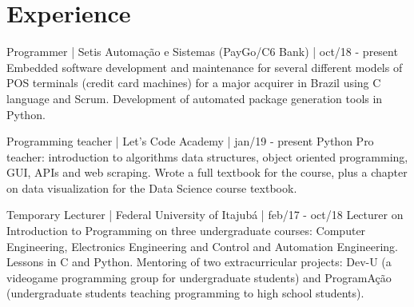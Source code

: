 \documentclass[]{cv-style}          %
\begin{document}
\section{Experience}
\vspace{-0.3cm}
\begin{entrylist}


\entry
{}
{Programmer | Setis Automação e Sistemas (PayGo/C6 Bank) | oct/18 - present}
{\vspace{-0.01cm}}
{Embedded software development and maintenance for several different models of POS terminals (credit card machines) for a major acquirer in Brazil using C language and Scrum. Development of automated package generation tools in Python.}
{}

\entry
  {}
  {Programming teacher | Let's Code Academy | jan/19 - present}
  {\vspace{-0.01cm}}
{Python Pro teacher: introduction to algorithms data structures, object oriented programming, GUI, APIs and web scraping. Wrote a full textbook for the course, plus a chapter on data visualization for the Data Science course textbook.}
 {} %

\entry
  {}
  {Temporary Lecturer | Federal University of Itajubá | feb/17 - oct/18}
{\vspace{-0.01cm}}
{ Lecturer on Introduction to Programming on three undergraduate courses: Computer Engineering, Electronics Engineering and Control and Automation Engineering. Lessons in C and Python. Mentoring of two extracurricular projects: Dev-U (a videogame programming group for undergraduate students) and ProgramAção (undergraduate students teaching programming to high school students). }
\end{entrylist}
{\vspace{-0.4cm}}
\end{document}
